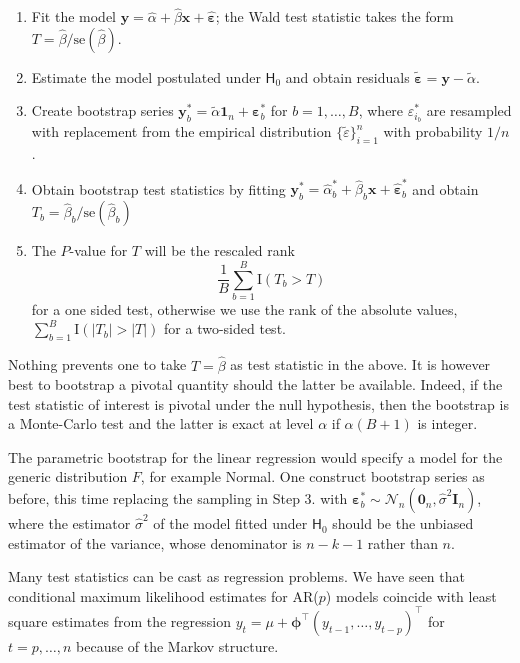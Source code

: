 \documentclass[]{book}
\providecommand{\tightlist}{%
  \setlength{\itemsep}{0pt}\setlength{\parskip}{0pt}}
\begin{document}
\begin{enumerate}
\def\labelenumi{\arabic{enumi}.}
\tightlist
\item
  Fit the model
  \(\boldsymbol{y}=\widehat{\alpha} + \widehat{\beta}\boldsymbol{x} + \widehat{\boldsymbol{\varepsilon}}\);
  the Wald test statistic takes the form
  \(T=\hat{\beta}/\mathrm{se}(\hat{\beta})\).
\item
  Estimate the model postulated under \(\mathsf{H}_0\) and obtain
  residuals
  \(\widetilde{\boldsymbol{\varepsilon}}=\boldsymbol{y}-\widetilde{\alpha}\).
\item
  Create bootstrap series
  \(\boldsymbol{y}_b^* = \widetilde{\alpha}\boldsymbol{1}_n + \boldsymbol{\varepsilon}_b^*\)
  for \(b=1, \ldots, B\), where \(\varepsilon_{i_b}^*\) are resampled
  with replacement from the empirical distribution
  \(\{\widetilde{\varepsilon}\}_{i=1}^n\) with probability \(1/n\).
\item
  Obtain bootstrap test statistics by fitting
  \(\boldsymbol{y}_b^*=\widehat{\alpha}_{b}^* + \widehat{\beta}_{b}\boldsymbol{x} + \widehat{\boldsymbol{\varepsilon}}_b^*\)
  and obtain \(T_b=\hat{\beta}_b/\mathrm{se}(\hat{\beta}_b)\)
\item
  The \(P\)-value for \(T\) will be the rescaled rank
  \[\frac{1}{B}\sum_{b=1}^B \mathrm{I}(T_b>T)\] for a one sided test,
  otherwise we use the rank of the absolute values,
  \(\sum_{b=1}^B \mathrm{I}(|T_b|>|T|)\) for a two-sided test.
\end{enumerate}

Nothing prevents one to take \(T=\hat{\beta}\) as test statistic in the
above. It is however best to bootstrap a pivotal quantity should the
latter be available. Indeed, if the test statistic of interest is
pivotal under the null hypothesis, then the bootstrap is a Monte-Carlo
test and the latter is exact at level \(\alpha\) if \(\alpha(B+1)\) is
integer.

The parametric bootstrap for the linear regression would specify a model
for the generic distribution \(F\), for example Normal. One construct
bootstrap series as before, this time replacing the sampling in Step 3.
with
\(\boldsymbol{\varepsilon}^*_b \sim \mathcal{N}_n(\boldsymbol{0}_n, \widehat{\sigma}^2\mathbf{I}_n)\),
where the estimator \(\widehat{\sigma}^2\) of the model fitted under
\(\mathsf{H}_0\) should be the unbiased estimator of the variance, whose
denominator is \(n-k-1\) rather than \(n\).

Many test statistics can be cast as regression problems. We have seen
that conditional maximum likelihood estimates for AR(\(p\)) models
coincide with least square estimates from the regression
\(y_t=\mu+\boldsymbol{\phi}^\top(y_{t-1}, \ldots, y_{t-p})^\top\) for
\(t=p, \ldots, n\) because of the Markov structure.
\end{document}
